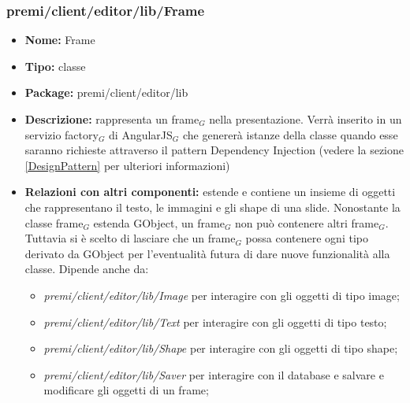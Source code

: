 \subsubsection{premi/client/editor/lib/Frame}
\begin{itemize}
  \item[] \textbf{Nome:} Frame
  \item[] \textbf{Tipo:} classe
  \item[] \textbf{Package:} premi/client/editor/lib
  \item[] \textbf{Descrizione:} rappresenta un frame$_G$ nella presentazione. Verrà inserito in un servizio factory$_G$ di AngularJS$_G$ che genererà istanze della classe quando esse saranno richieste attraverso il pattern Dependency Injection (vedere la sezione \ref{DesignPattern} per ulteriori informazioni)
  \item[] \textbf{Relazioni con altri componenti:} estende  e contiene un insieme di oggetti  che rappresentano il testo, le immagini e gli shape di una slide. Nonostante la classe frame$_G$ estenda GObject, un frame$_G$ non può contenere altri frame$_G$. Tuttavia si è scelto di lasciare che un frame$_G$ possa contenere ogni tipo derivato da GObject per l'eventualità futura di dare nuove funzionalità alla classe. Dipende anche da: 
\begin{itemize} 
	\item \textit{premi/client/editor/lib/Image} per interagire con gli oggetti di tipo image;
	\item \textit{premi/client/editor/lib/Text} per interagire con gli oggetti di tipo testo;
	\item \textit{premi/client/editor/lib/Shape} per interagire con gli oggetti di tipo shape;
	\item \textit{premi/client/editor/lib/Saver} per interagire con il database e salvare e modificare gli oggetti di un frame;
\end{itemize}  
\end{itemize}
